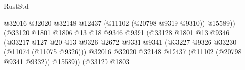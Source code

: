 \begin{lexlean}{RustStd}
\begin{coremodule}
                                                              @32016
                                                              @32020
                                                              @32148
                                                              @12437
                                                              (@11102 (@20798 @9319 @9310))
                                                              @15589))
                                                          (@33120
                                                            @1801
                                                            @1806
                                                            @13
                                                            @18
                                                            @9346
                                                            @9391
                                                            (@33128
                                                              @1801
                                                              @13
                                                              @9346
                                                              (@33217
                                                                @127
                                                                @20
                                                                @13
                                                                @9326
                                                                @2672
                                                                @9331
                                                                @9341
                                                                (@33227
                                                                  @9326
                                                                  @33230
                                                                  (@11074 (@11075 @9326)))
                                                                @32016
                                                                @32020
                                                                @32148
                                                                @12437
                                                                (@11102 (@20798 @9341 @9332))
                                                                @15589))
                                                            (@33120
                                                              @1803

\end{coremodule}
\end{lexlean}
